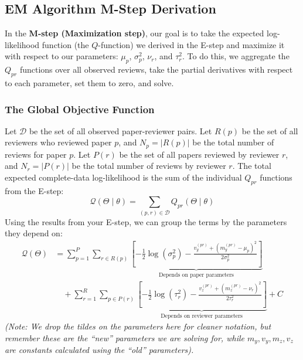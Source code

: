 \documentclass[twoside, 10pt]{article}
\begin{document}
\subsection{EM Algorithm M-Step Derivation}
In the \textbf{M-step (Maximization step)}, our goal is to take the expected log-likelihood function (the $Q$-function) we derived in the E-step and maximize it with respect to our parameters: $\mu_p$, $\sigma_p^2$, $\nu_r$, and $\tau_r^2$.
To do this, we aggregate the $Q_{pr}$ functions over all observed reviews, take the partial derivatives with respect to each parameter, set them to zero, and solve.
\subsubsection{The Global Objective Function}
Let $\mathcal{D}$ be the set of all observed paper-reviewer pairs. Let $R(p)$ be the set of all reviewers who reviewed paper $p$, and $N_p = |R(p)|$ be the total number of reviews for paper $p$. Let $P(r)$ be the set of all papers reviewed by reviewer $r$, and $N_r = |P(r)|$ be the total number of reviews by reviewer $r$.
The total expected complete-data log-likelihood is the sum of the individual $Q_{pr}$ functions from the E-step:
\[
\mathcal{Q}(\Theta \mid \theta) = \sum_{(p,r) \in \mathcal{D}} Q_{pr}(\Theta \mid \theta)
\]
Using the results from your E-step, we can group the terms by the parameters they depend on:
\begin{align*}
\mathcal{Q}(\Theta) &= \sum_{p=1}^P \sum_{r \in R(p)} \underbrace{\left[ -\frac{1}{2}\log(\sigma_p^2) - \frac{v_y^{(pr)} + (m_y^{(pr)} - \mu_p)^2}{2\sigma_p^2} \right]}_{\text{Depends on paper parameters}} \\
&\quad + \sum_{r=1}^R \sum_{p \in P(r)} \underbrace{\left[ -\frac{1}{2}\log(\tau_r^2) - \frac{v_z^{(pr)} + (m_z^{(pr)} - \nu_r)^2}{2\tau_r^2} \right]}_{\text{Depends on reviewer parameters}} + C
\end{align*}
\textit{(Note: We drop the tildes on the parameters here for cleaner notation, but remember these are the ``new'' parameters we are solving for, while $m_y, v_y, m_z, v_z$ are constants calculated using the ``old'' parameters).}
\end{document}
